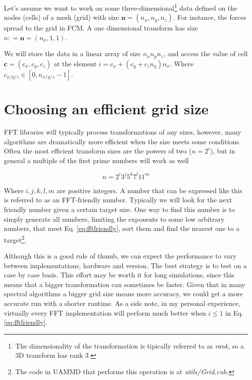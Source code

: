 \documentclass[twoside,openright,titlepage,numbers=noenddot,%
headinclude,footinclude,cleardoublepage=empty,abstract=on,
BCOR=5mm,fontsize=11pt, dvipsnames, paper=b5
]{scrreprt}
\renewcommand{\vec}[1]{\bm{#1}}
\newcommand{\uammd}{\gls{UAMMD}\xspace}
\begin{document}
Let's assume we want to work on some three-dimensional\footnote{The dimensionality of the transformation is tipically referred to as \emph{rank}, so a 3D transform has rank 3.} data defined on the nodes (cells) of a mesh (grid) with size $\vec{n} = (n_x, n_y, n_z)$. For instance, the forces spread to the grid in \gls{FCM}.
A one dimensional transform has size $n: = \vec{n} =(n_x,1,1)$.

We will store the data in a linear array of size $n_xn_yn_z$, and access the value of cell $\vec{c} = (c_x,c_y,c_z)$ at the element $i = c_x + (c_y + c_zn_y)n_x$. Where $c_{x/y/z} \in [0, n_{x/y/z}-1]$.

\section*{Choosing an efficient grid size}
\gls{FFT} libraries will typically process transformations of any sizes, however, many algorithms are dramatically more efficient when the size meets some conditions. Often the most efficient transform sizes are the powers of two ($n = 2^i$), but in general a multiple of the first prime numbers will work as well

\begin{equation}
  \label{eq:fftfriendly}
n = 2^i3^j5^k7^l11^m
\end{equation}

Where $i,j,k,l,m$ are positive integers. A number that can be expressed like this is referred to as an \gls{FFT}-friendly number.
Typically we will look for the next friendly number given a certain target size. One way to find this number is to simply generate all numbers, limiting the exponents to some low arbitrary numbers, that meet Eq. \eqref{eq:fftfriendly}, sort them and find the nearest one to a target\footnote{The code in \uammd that performs this operation is at \emph{utils/Grid.cuh}.}.

Although this is a good rule of thumb, we can expect the performance to vary between implementations, hardware and version. The best strategy is to test on a case by case basis. This effort may be worth it for long simulations, since this means that a bigger transformation can sometimes be faster. Given that in many spectral algorithms a bigger grid size means more accuracy, we could get a more accurate run with a shorter runtime. As a side note, in my personal experience, virtually every \gls{FFT} implementation will perform much better when $i\le 1$ in Eq. \eqref{eq:fftfriendly}.
\end{document}
